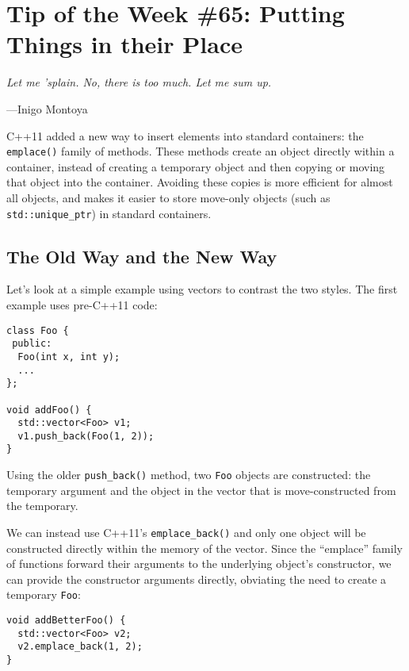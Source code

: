 
\chapter{Tip of the Week \#65: Putting Things in their Place}\label{ch:tip-of-the-week-65}
\epigraph{\itshape Let me ’splain. No, there is too much. Let me sum up.}{---Inigo Montoya}

C++11 added a new way to insert elements into standard containers: the \texttt{emplace()} family of methods. These methods create an object directly within a container, instead of creating a temporary object and then copying or moving that object into the container. Avoiding these copies is more efficient for almost all objects, and makes it easier to store move-only objects (such as \texttt{std::unique_ptr}) in standard containers.

\section{The Old Way and the New Way}
Let’s look at a simple example using vectors to contrast the two styles. The first example uses pre-C++11 code:
\begin{verbatim}
class Foo {
 public:
  Foo(int x, int y);
  ...
};

void addFoo() {
  std::vector<Foo> v1;
  v1.push_back(Foo(1, 2));
}
\end{verbatim}
Using the older \texttt{push_back()} method, two \texttt{Foo} objects are constructed: the temporary argument and the object in the vector that is move-constructed from the temporary.

We can instead use C++11’s \texttt{emplace_back()} and only one object will be constructed directly within the memory of the vector. Since the “emplace” family of functions forward their arguments to the underlying object’s constructor, we can provide the constructor arguments directly, obviating the need to create a temporary \texttt{Foo}:
\begin{verbatim}
void addBetterFoo() {
  std::vector<Foo> v2;
  v2.emplace_back(1, 2);
}
\end{verbatim}

